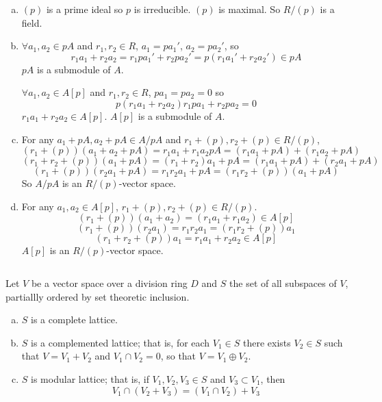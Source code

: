 \begin{answer}
    \begin{enumerate}[(a)]
        \item $(p)$ is a prime ideal so $p$ is irreducible. $(p)$ is maximal. So $R /(p)$ is a field.
        \item $\forall a_{1},a_{2}\in pA$ and $r_{1},r_{2}\in R$, $a_{1}=pa_{1}'$, $a_{2}=pa_{2}'$, so \[r_{1}a_{1}+r_{2}a_{2}=r_{1}pa_{1}'+r_{2}pa_{2}'=p(r_{1}a_{1}'+r_{2}a_{2}')\in pA\] $pA$ is a submodule of $A$.
        
        $\forall a_{1},a_{2}\in A[p]$ and $r_{1},r_{2}\in R$, $pa_{1}=pa_{2}=0$ so \[p(r_{1}a_{1}+r_{2}a_{2})r_{1}pa_{1}+r_{2}pa_{2}=0\] $r_{1}a_{1}+r_{2}a_{2}\in A[p]$. $A[p]$ is a submodule of $A$.
        \item For any $a_{1}+pA, a_{2}+pA\in A /pA$ and $r_{1}+(p), r_{2}+(p)\in R /(p)$,\[(r_{1}+(p))(a_{1}+a_{2}+pA)=r_{1}a_{1}+r_{1}a_{2}pA=(r_{1}a_{1}+pA)+(r_{1}a_{2}+pA)\]\[(r_{1}+r_{2}+(p))(a_{1}+pA)=(r_{1}+r_{2})a_{1}+pA=(r_{1}a_{1}+pA)+(r_{2}a_{1}+pA)\]\[(r_{1}+(p))(r_{2}a_{1}+pA)=r_{1}r_{2}a_{1}+pA=(r_{1}r_{2}+(p))(a_{1}+pA)\] So $A /pA$ is an $R /(p)$-vector space.
        \item For any $a_{1},a_{2}\in A[p]$, $r_{1}+(p), r_{2}+(p)\in R /(p)$.\[(r_{1}+(p))(a_{1}+a_{2})=(r_{1}a_{1}+r_{1}a_{2})\in A[p]\]\[(r_{1}+(p))(r_{2}a_{1})=r_{1}r_{2}a_{1}=(r_{1}r_{2}+(p))a_{1}\]\[(r_{1}+r_{2}+(p))a_{1}=r_{1}a_{1}+r_{2}a_{2}\in A[p]\] $A[p]$ is an $R /(p)$-vector space. 
    \end{enumerate}
\end{answer}

$$ $$

\begin{ex}
    Let $V$ be a vector space over a division ring $D$ and $S$ the set of all subspaces of $V$, partiallly ordered by set theoretic inclusion.
    \begin{enumerate}[(a)]
        \item $S$ is a complete lattice.
        \item $S$ is a complemented lattice; that is, for each $V_{1}\in S$ there exists $V_{2}\in S$ such that $V=V_{1}+V_{2}$ and $V_{1}\cap V_{2}=0$, so that $V=V_{1}\oplus V_{2}$.
        \item $S$ is modular lattice; that is, if $V_{1}, V_{2}, V_{3}\in S$ and $V_{3}\subset V_{1}$, then \[V_{1}\cap (V_{2}+V_{3})=(V_{1}\cap V_{2})+V_{3}\]
    \end{enumerate}
\end{ex}


